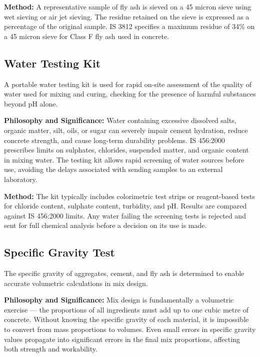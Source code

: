\par\noindent
\textbf{Method:} A representative sample of fly ash is sieved on a 45 micron sieve using wet sieving or air jet sieving. The residue retained on the sieve is expressed as a percentage of the original sample. IS 3812 specifies a maximum residue of 34\% on a 45 micron sieve for Class F fly ash used in concrete.

\subsection{Water Testing Kit}
\par\noindent
A portable water testing kit is used for rapid on-site assessment of the quality of water used for mixing and curing, checking for the presence of harmful substances beyond pH alone.

\par\noindent
\textbf{Philosophy and Significance:} Water containing excessive dissolved salts, organic matter, silt, oils, or sugar can severely impair cement hydration, reduce concrete strength, and cause long-term durability problems. IS 456:2000 prescribes limits on sulphates, chlorides, suspended matter, and organic content in mixing water. The testing kit allows rapid screening of water sources before use, avoiding the delays associated with sending samples to an external laboratory.

\par\noindent
\textbf{Method:} The kit typically includes colorimetric test strips or reagent-based tests for chloride content, sulphate content, turbidity, and pH. Results are compared against IS 456:2000 limits. Any water failing the screening tests is rejected and sent for full chemical analysis before a decision on its use is made.

\subsection{Specific Gravity Test}
\par\noindent
The specific gravity of aggregates, cement, and fly ash is determined to enable accurate volumetric calculations in mix design.

\par\noindent
\textbf{Philosophy and Significance:} Mix design is fundamentally a volumetric exercise --- the proportions of all ingredients must add up to one cubic metre of concrete. Without knowing the specific gravity of each material, it is impossible to convert from mass proportions to volumes. Even small errors in specific gravity values propagate into significant errors in the final mix proportions, affecting both strength and workability.

